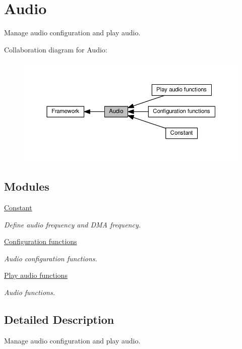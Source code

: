 \hypertarget{group___audio}{}\section{Audio}
\label{group___audio}


Manage audio configuration and play audio.  


Collaboration diagram for Audio\+:\nopagebreak
\begin{figure}[H]
\begin{center}
\leavevmode
\includegraphics[width=350pt]{db/d5e/group___audio}
\end{center}
\end{figure}
\subsection*{Modules}
\begin{DoxyCompactItemize}
\item 
\hyperlink{group___constant}{Constant}
\begin{DoxyCompactList}\small\item\em Define audio frequency and D\+MA frequency. \end{DoxyCompactList}\item 
\hyperlink{group___audio___init}{Configuration functions}
\begin{DoxyCompactList}\small\item\em Audio configuration functions. \end{DoxyCompactList}\item 
\hyperlink{group___audio___play}{Play audio functions}
\begin{DoxyCompactList}\small\item\em Audio functions. \end{DoxyCompactList}\end{DoxyCompactItemize}


\subsection{Detailed Description}
Manage audio configuration and play audio. 

